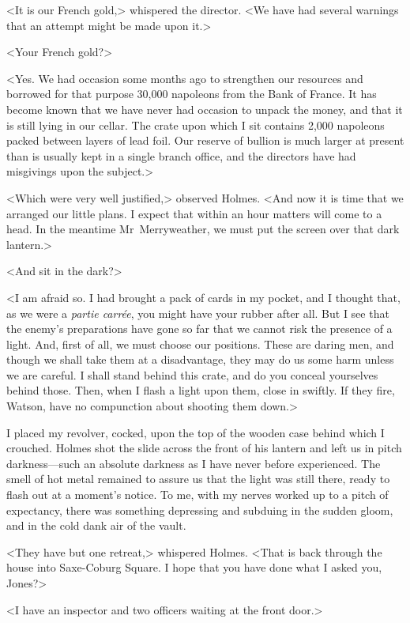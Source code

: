 <It is our French gold,> whispered the director. <We have had several warnings that an attempt might be made upon it.>

<Your French gold?>

<Yes. We had occasion some months ago to strengthen our resources and borrowed for that purpose 30,000 napoleons from the Bank of France. It has become known that we have never had occasion to unpack the money, and that it is still lying in our cellar. The crate upon which I sit contains 2,000 napoleons packed between layers of lead foil. Our reserve of bullion is much larger at present than is usually kept in a single branch office, and the directors have had misgivings upon the subject.>

<Which were very well justified,> observed Holmes. <And now it is time that we arranged our little plans. I expect that within an hour matters will come to a head. In the meantime Mr~Merryweather, we must put the screen over that dark lantern.>

<And sit in the dark?>

<I am afraid so. I had brought a pack of cards in my pocket, and I thought that, as we were a \textit{partie carrée}, you might have your rubber after all. But I see that the enemy's preparations have gone so far that we cannot risk the presence of a light. And, first of all, we must choose our positions. These are daring men, and though we shall take them at a disadvantage, they may do us some harm unless we are careful. I shall stand behind this crate, and do you conceal yourselves behind those. Then, when I flash a light upon them, close in swiftly. If they fire, Watson, have no compunction about shooting them down.>

I placed my revolver, cocked, upon the top of the wooden case behind which I crouched. Holmes shot the slide across the front of his lantern and left us in pitch darkness—such an absolute darkness as I have never before experienced. The smell of hot metal remained to assure us that the light was still there, ready to flash out at a moment's notice. To me, with my nerves worked up to a pitch of expectancy, there was something depressing and subduing in the sudden gloom, and in the cold dank air of the vault.

<They have but one retreat,> whispered Holmes. <That is back through the house into Saxe-Coburg Square. I hope that you have done what I asked you, Jones?>

<I have an inspector and two officers waiting at the front door.>

